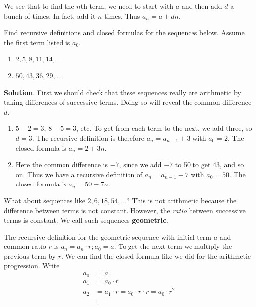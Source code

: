 \documentclass[11pt,]{book}
\newcommand{\terminology}[1]{\textbf{#1}}
\theoremstyle{ptxplainnotitle}
\theoremstyle{ptxplaintitle}
\theoremstyle{ptxdefinitionnotitle}
\theoremstyle{ptxdefinitiontitle}
\theoremstyle{ptxdefinitionnotitle}
\theoremstyle{ptxdefinitiontitle}
\theoremstyle{ptxdefinitionnotitle}
\theoremstyle{ptxdefinitiontitle}
\theoremstyle{ptxdefinitiontitlenonumber}
\theoremstyle{ptxdefinitiontitlenonumber}
\numberwithin{equation}{chapter}
\newcommand{\amp}{&}
\begin{document}
%
\par
\hypertarget{p-163}{}%
We see that to find the \(n\)th term, we need to start with \(a\) and then add \(d\) a bunch of times. In fact, add it \(n\) times. Thus \(a_n = a+dn\).%
\begin{example}\label{example-5}
\hypertarget{p-164}{}%
Find recursive definitions and closed formulas for the sequences below. Assume the first term listed is \(a_0\).%
\par
\hypertarget{p-165}{}%
\leavevmode%
\begin{enumerate}
\item\hypertarget{li-108}{}\(2, 5, 8, 11, 14, \ldots\).%
\item\hypertarget{li-109}{}\(50, 43, 36, 29, \ldots\).%
\end{enumerate}
%
\par\smallskip%
\noindent\textbf{Solution}.\hypertarget{solution-13}{}\quad%
\hypertarget{p-166}{}%
First we should check that these sequences really are arithmetic by taking differences of successive terms. Doing so will reveal the common difference \(d\).%
\par
\hypertarget{p-167}{}%
\leavevmode%
\begin{enumerate}
\item\hypertarget{li-110}{}\(5-2 = 3\), \(8-5 = 3\), etc. To get from each term to the next, we add three, so \(d = 3\). The recursive definition is therefore \(a_n = a_{n-1} + 3\) with \(a_0 = 2\). The closed formula is \(a_n = 2 + 3n\).%
\item\hypertarget{li-111}{}\hypertarget{p-168}{}%
Here the common difference is \(-7\), since we add \(-7\) to 50 to get 43, and so on. Thus we have a recursive definition of \(a_n = a_{n-1} - 7\) with \(a_0 = 50\). The closed formula is \(a_n = 50 - 7n\).%
\end{enumerate}
%
\end{example}
\hypertarget{p-169}{}%
What about sequences like \(2, 6, 18, 54, \ldots\)? This is not arithmetic because the difference between terms is not constant. However, the \emph{ratio} between successive terms is constant. We call such sequences \terminology{geometric}.%
\par
\hypertarget{p-170}{}%
The recursive definition for the geometric sequence with initial term \(a\) and common ratio \(r\) is \(a_n = a_{n}\cdot r; a_0 = a\). To get the next term we multiply the previous term by \(r\). We can find the closed formula like we did for the arithmetic progression. Write%
\begin{align*}
a_0 \amp = a\\
a_1 \amp = a_0\cdot r\\
a_2 \amp = a_1 \cdot r = a_0\cdot r\cdot r = a_0\cdot r^2\\
\amp \vdots 
\end{align*}
\end{document}
